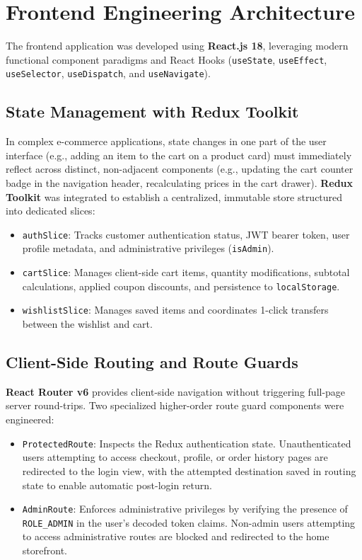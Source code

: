 \section{Frontend Engineering Architecture}
The frontend application was developed using \textbf{React.js 18}, leveraging modern functional component paradigms and React Hooks (\texttt{useState}, \texttt{useEffect}, \texttt{useSelector}, \texttt{useDispatch}, and \texttt{useNavigate}).

\subsection{State Management with Redux Toolkit}
In complex e-commerce applications, state changes in one part of the user interface (e.g., adding an item to the cart on a product card) must immediately reflect across distinct, non-adjacent components (e.g., updating the cart counter badge in the navigation header, recalculating prices in the cart drawer). \textbf{Redux Toolkit} was integrated to establish a centralized, immutable store structured into dedicated slices:
\begin{itemize}[leftmargin=2.0em]
    \item \texttt{authSlice}: Tracks customer authentication status, JWT bearer token, user profile metadata, and administrative privileges (\texttt{isAdmin}).
    \item \texttt{cartSlice}: Manages client-side cart items, quantity modifications, subtotal calculations, applied coupon discounts, and persistence to \texttt{localStorage}.
    \item \texttt{wishlistSlice}: Manages saved items and coordinates 1-click transfers between the wishlist and cart.
\end{itemize}

\subsection{Client-Side Routing and Route Guards}
\textbf{React Router v6} provides client-side navigation without triggering full-page server round-trips. Two specialized higher-order route guard components were engineered:
\begin{itemize}[leftmargin=2.0em]
    \item \texttt{ProtectedRoute}: Inspects the Redux authentication state. Unauthenticated users attempting to access checkout, profile, or order history pages are redirected to the login view, with the attempted destination saved in routing state to enable automatic post-login return.
    \item \texttt{AdminRoute}: Enforces administrative privileges by verifying the presence of \texttt{ROLE\_ADMIN} in the user's decoded token claims. Non-admin users attempting to access administrative routes are blocked and redirected to the home storefront.
\end{itemize}

